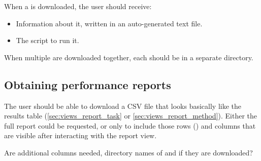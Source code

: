 When a \Method is downloaded, the user should receive:
\begin{itemize}
    \item Information about it, written in an auto-generated text file.
    \item The script to run it.
\end{itemize}

When multiple \Methods are downloaded together, each should be in a separate directory.


\subsection{Obtaining performance reports}
\label{sec:downloads_report}

The user should be able to download a CSV file that looks basically like the results table \Report (\cref{sec:views_report_task} or \cref{sec:views_report_method}).
Either the full report could be requested, or only to include those rows (\Elements) and columns that are visible after interacting with the report view.

Are additional columns needed, \eg directory names of \Elements and \Methods if they are downloaded?
